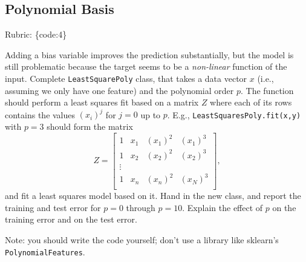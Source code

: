 \documentclass{article}
\def\rubric#1{\gre{Rubric: \{#1\}}}{}
\def\blu#1{{\color{blu}#1}}
\def\gre#1{{\color{gre}#1}}
\begin{document}
\subsection{Polynomial Basis}
\rubric{code:4}

Adding a bias variable improves the prediction substantially, but the model is still problematic because the target seems to be a \emph{non-linear} function of the input.
Complete \texttt{LeastSquarePoly} class, that takes a data vector $x$ (i.e., assuming we only have one feature) and the polynomial order $p$. The function should perform a least squares fit based on a matrix $Z$ where each of its rows contains the values $(x_{i})^j$ for $j=0$ up to $p$. E.g., \texttt{LeastSquaresPoly.fit(x,y)}  with $p = 3$ should form the matrix
\[
Z =
\left[\begin{array}{cccc}
1 & x_1 & (x_1)^2 & (x_1)^3\\
1 & x_2 & (x_2)^2 & (x_2)^3\\
\vdots\\
1 & x_n & (x_n)^2 & (x_N)^3\\
\end{array}
\right],
\]
and fit a least squares model based on it.
\blu{Hand in the new class, and report the training and test error for $p = 0$ through $p= 10$. Explain the effect of $p$ on the training error and on the test error.}

Note: you should write the code yourself; don't use a library like sklearn's \texttt{PolynomialFeatures}.

\begin{center}
    
\end{center}
\end{document}
